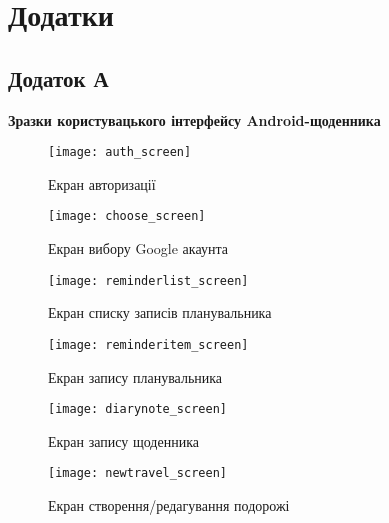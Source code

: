 \setcounter{chapter}{1}
\setcounter{figure}{0}
\renewcommand\thechapter{\Alph{chapter}}

\chapter*{Додатки}

\centeredsection

\section*{Додаток А}
\begin{center}
	\bfseries Зразки користувацького інтерфейсу Android-щоденника
\end{center}

\begin{figure}[H]
	\centering
	\texttt{[image: auth\_screen]}
	\caption{Екран авторизації}
	\label{auth_screen}
\end{figure}

\begin{figure}[H]
	\centering
	\texttt{[image: choose\_screen]}
	\caption{Екран вибору Google акаунта}
	\label{choose_screen}
\end{figure}

\begin{figure}[H]
	\centering
	\texttt{[image: reminderlist\_screen]}
	\caption{Екран списку записів планувальника}
	\label{reminder_list_screen}
\end{figure}

\begin{figure}[H]
	\centering
	\texttt{[image: reminderitem\_screen]}
	\caption{Екран запису планувальника}
	\label{reminder_screen}
\end{figure}

\begin{figure}[H]
	\centering
	\texttt{[image: diarynote\_screen]}
	\caption{Екран запису щоденника}
	\label{diary_screen}
\end{figure}

\begin{figure}[H]
	\centering
	\texttt{[image: newtravel\_screen]}
	\caption{Екран створення/редагування подорожі}
	\label{new_travel_screen}
\end{figure}


